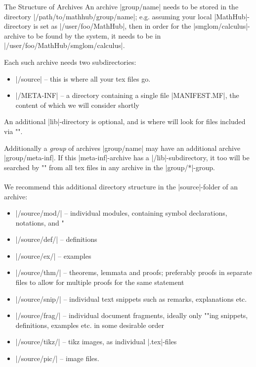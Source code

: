 \begin{sfragment}{The Structure of \sTeX Archives}
    An \sTeX archive |group/name| needs to be stored in the
    directory |/path/to/mathhub/group/name|; e.g. assuming your
    local |MathHub|-directory is set as |/user/foo/MathHub|, then
    in order for the |smglom/calculus|-archive to be found by the
    \sTeX system, it needs to be in |/user/foo/MathHub/smglom/calculus|.

    Each such archive needs two subdirectories:
    \begin{itemize}
        \item |/source| -- this is where all your tex files go.
        \item |/META-INF| -- a directory containing a single file
            |MANIFEST.MF|, the content of which we will consider shortly
    \end{itemize}
    An additional |lib|-directory is optional, and is where \sTeX will
    look for files included via \stexcode"\libinput".

    Additionally a \emph{group} of archives |group/name| may have
    an additional archive |group/meta-inf|. If this |meta-inf|-archive
    has a |/lib|-subdirectory, it too will be searched by \stexcode"\libinput"
    from all tex files in any archive in the |group/*|-group.

    \paragraph{} We recommend this additional directory structure in the |source|-folder
    of an \sTeX archive:
    \begin{itemize}
        \item |/source/mod/| -- individual \sTeX modules, containing
            symbol declarations, notations, and 
            \stexcode"\fi
        \item |/source/def/| -- definitions
        \item |/source/ex/| -- examples
        \item |/source/thm/| -- theorems, lemmata and proofs; preferably
            proofs in separate files to allow for multiple proofs for the
            same statement
        \item |/source/snip/| -- individual text snippets such as remarks,
            explanations etc.
        \item |/source/frag/| -- individual document fragments,
            ideally only \stexcode""ing snippets, definitions,
            examples etc. in some desirable order
        \item |/source/tikz/| -- tikz images, as individual |.tex|-files
        \item |/source/pic/| -- image files.
    \end{itemize}

\end{sfragment}

